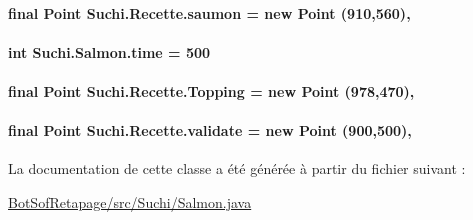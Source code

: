 \paragraph[{saumon}]{\setlength{\rightskip}{0pt plus 5cm}final Point Suchi.\+Recette.\+saumon = new Point (910,560)\hspace{0.3cm}{\ttfamily [protected]}, {\ttfamily [inherited]}}\label{classSuchi_1_1Recette_a17aeabd21e3d4d55d7caae9a40bfc6a1}
\hypertarget{classSuchi_1_1Salmon_ae20cc48a24b313ef4d32ea6da5257128}{}
\paragraph[{time}]{\setlength{\rightskip}{0pt plus 5cm}int Suchi.\+Salmon.\+time = 500\hspace{0.3cm}{\ttfamily [private]}}\label{classSuchi_1_1Salmon_ae20cc48a24b313ef4d32ea6da5257128}
\hypertarget{classSuchi_1_1Recette_a4810b2254c050209fba27757066668b3}{}
\paragraph[{Topping}]{\setlength{\rightskip}{0pt plus 5cm}final Point Suchi.\+Recette.\+Topping = new Point (978,470)\hspace{0.3cm}{\ttfamily [protected]}, {\ttfamily [inherited]}}\label{classSuchi_1_1Recette_a4810b2254c050209fba27757066668b3}
\hypertarget{classSuchi_1_1Recette_aff16265c9b0b819091af71f64ef84be7}{}
\paragraph[{validate}]{\setlength{\rightskip}{0pt plus 5cm}final Point Suchi.\+Recette.\+validate = new Point (900,500)\hspace{0.3cm}{\ttfamily [protected]}, {\ttfamily [inherited]}}\label{classSuchi_1_1Recette_aff16265c9b0b819091af71f64ef84be7}


La documentation de cette classe a été générée à partir du fichier suivant \+:\begin{DoxyCompactItemize}
\item 
\hyperlink{BotSofRetapage_2src_2Suchi_2Salmon_8java}{Bot\+Sof\+Retapage/src/\+Suchi/\+Salmon.\+java}\end{DoxyCompactItemize}

